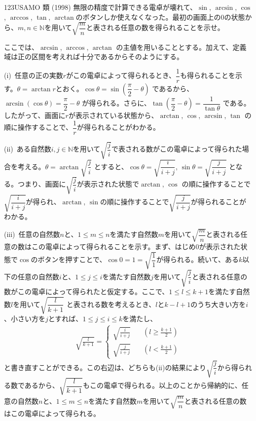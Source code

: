 \begin{prob}{123}{}{USAMO 類 (1998)}
 無限の精度で計算できる電卓が壊れて、$\sin$, $\arcsin$, $\cos$, $\arccos$, $\tan$, $\arctan$のボタンしか使えなくなった。最初の画面上の0の状態から、$m, n\in\mathbb{N}$を用いて$\sqrt{\dfrac{m}{n}}$と表される任意の数を得られることを示せ。
\end{prob}

ここでは、$\arcsin$, $\arccos$, $\arctan$ の主値を用いることとする。加えて、定義域は正の区間を考えれば十分であるからそのようにする。

(i)~任意の正の実数$r$がこの電卓によって得られるとき、$\dfrac{1}{r}$も得られることを示す。$\theta=\arctan r$とおく。$\cos\theta=\sin\left(\dfrac{\pi}{2}-\theta\right)$ であるから、$\arcsin(\cos\theta)=\dfrac{\pi}{2}-\theta$ が得られる。さらに、$\tan\left(\dfrac{\pi}{2}-\theta\right)=\dfrac{1}{\tan\theta}$ である。したがって、画面に$r$が表示されている状態から、$\arctan$, $\cos$, $\arcsin$, $\tan$ の順に操作することで、$\dfrac{1}{r}$が得られることがわかる。

(ii)~ある自然数$i, j\in\mathbb{N}$を用いて$\sqrt{\dfrac{j}{i}}$で表される数がこの電卓によって得られた場合を考える。$\theta=\arctan \sqrt{\dfrac{j}{i}}$ とすると、$\cos\theta=\sqrt{\dfrac{i}{i+j}}$, $\sin\theta=\sqrt{\dfrac{j}{i+j}}$ となる。つまり、画面に$\sqrt{\dfrac{j}{i}}$が表示された状態で$\arctan$, $\cos$ の順に操作することで$\sqrt{\dfrac{i}{i+j}}$が得られ、$\arctan$, $\sin$の順に操作することで$\sqrt{\dfrac{j}{i+j}}$が得られることがわかる。

(iii)~任意の自然数$n$と、$1\le m \le n$を満たす自然数$m$を用いて$\sqrt{\dfrac{m}{n}}$と表される任意の数はこの電卓によって得られることを示す。まず、はじめ$0$が表示された状態で$\cos$のボタンを押すことで、$\cos 0 = 1 = \sqrt{\dfrac{1}{1}}$が得られる。続いて、ある$k$以下の任意の自然数$i$と、$1\le j \le i$を満たす自然数$j$を用いて$\sqrt{\dfrac{j}{i}}$と表される任意の数がこの電卓によって得られたと仮定する。ここで、$1\le l \le k+1$を満たす自然数$l$を用いて$\sqrt{\dfrac{l}{k+1}}$ と表される数を考えるとき、$l$と$k-l+1$のうち大きい方を$i$、小さい方を$j$とすれば、$1\le j \le i \le k$を満たし、
\begin{align*}
 \sqrt{\frac{l}{k+1}}=\left\{
 \begin{aligned}
  \sqrt{\frac{i}{i+j}} &\quad\left(l\ge \frac{k+1}{2}\right) \\
  \sqrt{\frac{j}{i+j}} &\quad\left(l < \frac{k+1}{2}\right)
 \end{aligned}\right.
\end{align*}
と書き直すことができる。この右辺は、どちらも(ii)の結果により$\sqrt{\dfrac{j}{i}}$から得られる数であるから、$\sqrt{\dfrac{l}{k+1}}$もこの電卓で得られる。以上のことから帰納的に、任意の自然数$n$と、$1\le m \le n$を満たす自然数$m$を用いて$\sqrt{\dfrac{m}{n}}$と表される任意の数はこの電卓によって得られる。

